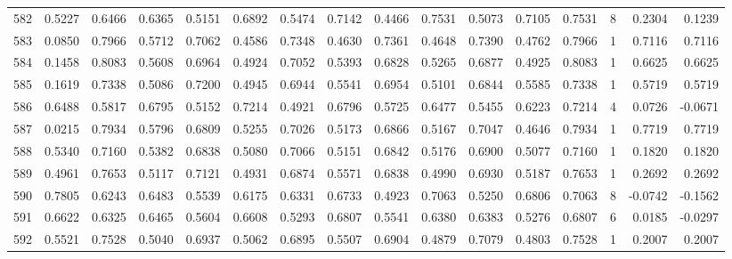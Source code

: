 \begin{tabular}{lrrrrrrrrrrrrrrr}
582 &      0.5227 &  0.6466 &  0.6365 &  0.5151 &  0.6892 &  0.5474 &  0.7142 &  0.4466 &  0.7531 &  0.5073 &   0.7105 &     0.7531 &      8 &                    0.2304 &                     0.1239 \\
583 &      0.0850 &  0.7966 &  0.5712 &  0.7062 &  0.4586 &  0.7348 &  0.4630 &  0.7361 &  0.4648 &  0.7390 &   0.4762 &     0.7966 &      1 &                    0.7116 &                     0.7116 \\
584 &      0.1458 &  0.8083 &  0.5608 &  0.6964 &  0.4924 &  0.7052 &  0.5393 &  0.6828 &  0.5265 &  0.6877 &   0.4925 &     0.8083 &      1 &                    0.6625 &                     0.6625 \\
585 &      0.1619 &  0.7338 &  0.5086 &  0.7200 &  0.4945 &  0.6944 &  0.5541 &  0.6954 &  0.5101 &  0.6844 &   0.5585 &     0.7338 &      1 &                    0.5719 &                     0.5719 \\
586 &      0.6488 &  0.5817 &  0.6795 &  0.5152 &  0.7214 &  0.4921 &  0.6796 &  0.5725 &  0.6477 &  0.5455 &   0.6223 &     0.7214 &      4 &                    0.0726 &                    -0.0671 \\
587 &      0.0215 &  0.7934 &  0.5796 &  0.6809 &  0.5255 &  0.7026 &  0.5173 &  0.6866 &  0.5167 &  0.7047 &   0.4646 &     0.7934 &      1 &                    0.7719 &                     0.7719 \\
588 &      0.5340 &  0.7160 &  0.5382 &  0.6838 &  0.5080 &  0.7066 &  0.5151 &  0.6842 &  0.5176 &  0.6900 &   0.5077 &     0.7160 &      1 &                    0.1820 &                     0.1820 \\
589 &      0.4961 &  0.7653 &  0.5117 &  0.7121 &  0.4931 &  0.6874 &  0.5571 &  0.6838 &  0.4990 &  0.6930 &   0.5187 &     0.7653 &      1 &                    0.2692 &                     0.2692 \\
590 &      0.7805 &  0.6243 &  0.6483 &  0.5539 &  0.6175 &  0.6331 &  0.6733 &  0.4923 &  0.7063 &  0.5250 &   0.6806 &     0.7063 &      8 &                   -0.0742 &                    -0.1562 \\
591 &      0.6622 &  0.6325 &  0.6465 &  0.5604 &  0.6608 &  0.5293 &  0.6807 &  0.5541 &  0.6380 &  0.6383 &   0.5276 &     0.6807 &      6 &                    0.0185 &                    -0.0297 \\
592 &      0.5521 &  0.7528 &  0.5040 &  0.6937 &  0.5062 &  0.6895 &  0.5507 &  0.6904 &  0.4879 &  0.7079 &   0.4803 &     0.7528 &      1 &                    0.2007 &                     0.2007 \\

\end{tabular}
